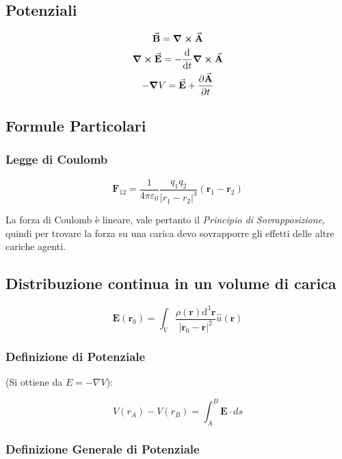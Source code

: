 \documentclass[a4paper]{scrarticle}
\begin{document}
\subsection{Potenziali}

\begin{gather}
    \va B = \curl{\va A} \\
    \curl{\va E} = -\dv{t}\curl{\va A}\\
    -\grad{V} = \va E + \pdv{\va A}{t}
\end{gather}

\subsection{Formule Particolari}

\subsubsection*{Legge di Coulomb}

\begin{equation}
    \bm F_{12} = \frac{1}{4\pi\varepsilon_0}\frac{q_1 q_2}{|r_1 - r_2|^3}(\bm r_1 - \bm r_2)
\end{equation}

La forza di Coulomb è lineare, vale pertanto il \emph{Principio di Sovrapposizione}, quindi per trovare la forza su una carica devo sovrapporre gli effetti delle altre cariche agenti.

\subsection*{Distribuzione continua in un volume di carica}

\begin{equation}
    \bm E(\bm r_0 ) = \int_{V} \frac{\rho(\bm r) \text{d}^3 \bm r}{|\bm r_0 - \bm r|^2} \hat{u}(\bm r)
\end{equation}

\subsubsection*{Definizione di Potenziale}
(Si ottiene da $E = -\nabla V$):

\begin{equation}
    V(r_A) - V(r_B) = \int_A^B \bm E \cdot ds
\end{equation}

\subsubsection*{Definizione Generale di Potenziale}
\end{document}
